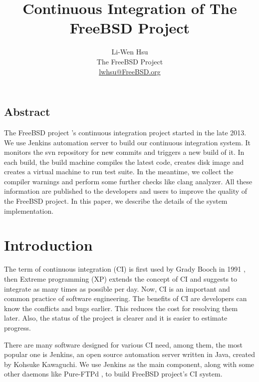 \documentclass[a4paper,twocolumn,10pt]{article}
\begin{document}
\date{}

\title{\Large \bf Continuous Integration of The FreeBSD Project}

\author{
{\rm Li-Wen Hsu}\\
{\rm The FreeBSD Project}\\
{\rm \href{mailto:lwhsu@FreeBSD.org}{lwhsu@FreeBSD.org}}
}

\maketitle

\thispagestyle{empty}

\subsection*{Abstract}
The FreeBSD project \cite{freebsd}'s continuous integration project started in
the late 2013.  We use Jenkins \cite{jenkins} automation server to build our
continuous integration system.  It monitors the svn repository for new commits
and triggers a new build of it.  In each build, the build machine compiles the
latest code, creates disk image and creates a virtual machine to run test
suite. In the meantime, we collect the compiler warnings and perform some
further checks like clang analyzer. All these information are published to the
developers and users to improve the quality of the FreeBSD project. In this
paper, we describe the details of the system implementation.

\section{Introduction}

The term of continuous integration (CI) is first used by Grady Booch in 1991
\cite{booch1991}, then Extreme programming (XP) extends the concept of CI and
suggests to integrate as many times as possible per day. Now, CI is an
important and common practice of software engineering. The benefits of CI are
developers can know the conflicts and bugs earlier. This reduces the cost for
resolving them later.  Also, the status of the project is clearer and it is
easier to estimate progress.

There are many software designed for various CI need, among them, the most
popular one is Jenkins, an open source automation server written in Java,
created by Kohsuke Kawaguchi. We use Jenkins as the main component, along with
some other daemons like Pure-FTPd \cite{pure-ftpd}, to build FreeBSD project's
CI system.
\end{document}
